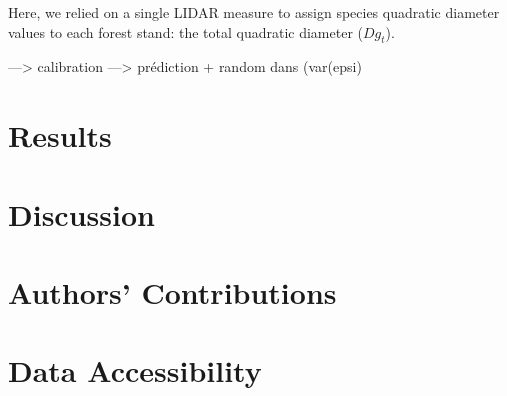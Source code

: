 \documentclass[a4paper]{article}
\begin{document}
Here, we relied on a single LIDAR measure to assign species quadratic diameter values to each forest stand: the total quadratic diameter ($Dg_t$).
    



---> calibration
---> prédiction + random dans (var(epsi)







\section*{Results}

\section*{Discussion}


\section*{Authors' Contributions}

\section*{Data Accessibility}



\end{document}
